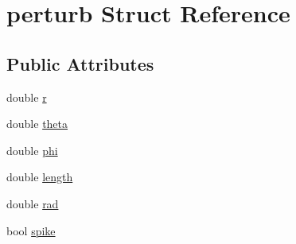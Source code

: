 \hypertarget{structperturb}{\section{perturb Struct Reference}
\label{structperturb}
}
\subsection*{Public Attributes}
\begin{DoxyCompactItemize}
\item 
double \hyperlink{structperturb_a17b885786a6640dd4e9ab2c728355c36}{r}
\item 
double \hyperlink{structperturb_a550c35c8109b1abf38143d431b04422f}{theta}
\item 
double \hyperlink{structperturb_a007934f3aee9bf27a197cf7b559dc088}{phi}
\item 
double \hyperlink{structperturb_abccd94528853ef8c8c9fc3ef752cedb3}{length}
\item 
double \hyperlink{structperturb_a10479a25e619975429bac41bab42443f}{rad}
\item 
bool \hyperlink{structperturb_a862becc421371eb341ce62bec437c607}{spike}
\end{DoxyCompactItemize}


